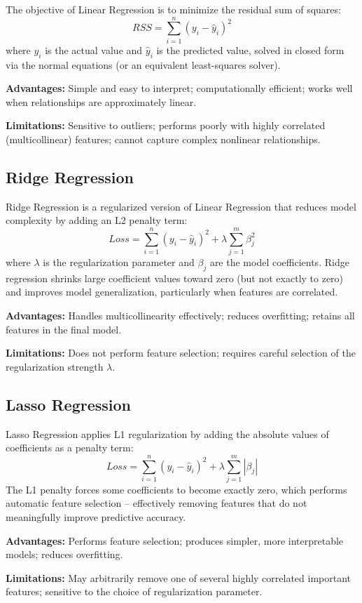 \documentclass[12pt,a4paper]{article}
\begin{document}
The objective of Linear Regression is to minimize the residual sum of squares:
\[
RSS = \sum_{i=1}^{n}(y_i - \hat{y}_i)^2
\]
where $y_i$ is the actual value and $\hat{y}_i$ is the predicted value, solved in closed form via the normal equations (or an equivalent least-squares solver).

\textbf{Advantages:} Simple and easy to interpret; computationally efficient; works well when relationships are approximately linear.

\textbf{Limitations:} Sensitive to outliers; performs poorly with highly correlated (multicollinear) features; cannot capture complex nonlinear relationships.

\subsection{Ridge Regression}

Ridge Regression is a regularized version of Linear Regression that reduces model complexity by adding an L2 penalty term:
\[
Loss = \sum_{i=1}^{n}(y_i-\hat{y}_i)^2 + \lambda\sum_{j=1}^{m}\beta_j^2
\]
where $\lambda$ is the regularization parameter and $\beta_j$ are the model coefficients. Ridge regression shrinks large coefficient values toward zero (but not exactly to zero) and improves model generalization, particularly when features are correlated.

\textbf{Advantages:} Handles multicollinearity effectively; reduces overfitting; retains all features in the final model.

\textbf{Limitations:} Does not perform feature selection; requires careful selection of the regularization strength $\lambda$.

\subsection{Lasso Regression}

Lasso Regression applies L1 regularization by adding the absolute values of coefficients as a penalty term:
\[
Loss = \sum_{i=1}^{n}(y_i-\hat{y}_i)^2 + \lambda\sum_{j=1}^{m}|\beta_j|
\]
The L1 penalty forces some coefficients to become exactly zero, which performs automatic feature selection -- effectively removing features that do not meaningfully improve predictive accuracy.

\textbf{Advantages:} Performs feature selection; produces simpler, more interpretable models; reduces overfitting.

\textbf{Limitations:} May arbitrarily remove one of several highly correlated important features; sensitive to the choice of regularization parameter.
\end{document}
